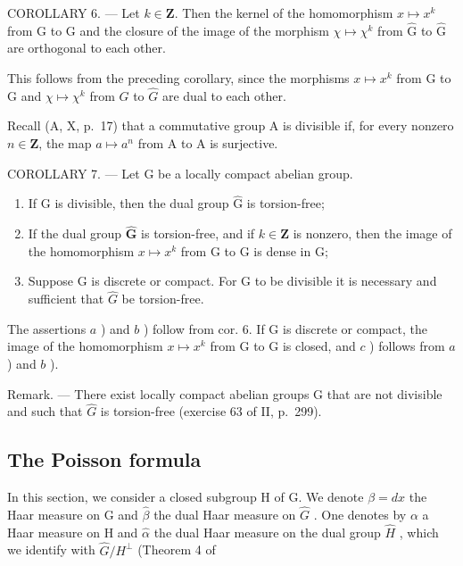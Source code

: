 COROLLARY 6. --- Let \(k \in \mathbf{Z}\). Then the kernel of the homomorphism \(x \mapsto x^k\) from G to G and the closure of the image of the morphism \(\chi \mapsto \chi^k\) from \(\widehat{\mathrm{G}}\) to \(\widehat{\mathrm{G}}\) are orthogonal to each other.

This follows from the preceding corollary, since the morphisms \(x \mapsto x^{k}\) from G to G and \(\chi \mapsto \chi^{k}\) from \(\widehat{G}\) to \(\widehat{G}\) are dual to each other.

Recall (A, X, p.~17) that a commutative group A is divisible if, for every nonzero \(n \in \mathbf{Z}\), the map \(a \mapsto a^n\) from A to A is surjective.

COROLLARY 7. --- Let G be a locally compact abelian group.

\begin{enumerate}
\def\labelenumi{\alph{enumi})}
\item
  If G is divisible, then the dual group \(\widehat{\mathrm{G}}\) is torsion-free;
\item
  If the dual group \(\widehat{\mathbf{G}}\) is torsion-free, and if \(k\in\mathbf{Z}\) is nonzero, then the image of the homomorphism \(x\mapsto x^{k}\) from G to G is dense in G;
\item
  Suppose G is discrete or compact. For G to be divisible it is necessary and sufficient that \(\widehat{G}\) be torsion-free.
\end{enumerate}

The assertions \(a\) ) and \(b\) ) follow from cor. 6. If G is discrete or compact, the image of the homomorphism \(x \mapsto x^k\) from G to G is closed, and \(c\) ) follows from \(a\) ) and \(b\) ).

Remark. --- There exist locally compact abelian groups G that are not divisible and such that \(\widehat{G}\) is torsion-free (exercise 63 of II, p.~299).

\subsection{The Poisson formula}

In this section, we consider a closed subgroup H of G. We denote \(\beta = dx\) the Haar measure on G and \(\widehat{\beta}\) the dual Haar measure on \(\widehat{G}\) . One denotes by \(\alpha\) a Haar measure on H and \(\widehat{\alpha}\) the dual Haar measure on the dual group \(\widehat{H}\) , which we identify with \(\widehat{G}/H^{\perp}\) (Theorem 4 of

